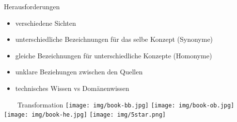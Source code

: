 \documentclass[aspectratio=1610,12pt]{beamer}
\newcommand{\imageslide}[4][]
{
\newgeometry{margin=0cm,top=1em}
\begin{frame}[plain]{~~~~#2}
\vspace{0.2em}
\centering\texttt{[image: \#3]}
\\#1
\note{#4}
\end{frame}
\restoregeometry
}
\begin{document}
{\begin{frame}{Herausforderungen}
\begin{itemize}
\item verschiedene Sichten
\item unterschiedliche Bezeichnungen für das selbe Konzept (Synonyme)
\item gleiche Bezeichnungen für unterschiedliche Konzepte (Homonyme)
\item unklare Beziehungen zwischen den Quellen
\item technisches Wissen vs Domänenwissen 
\end{itemize}
\end{frame}
\iffalse
\begin{frame}{Herausforderungen in der Transformation (2)}
\begin{itemize}
	\item Manuelle, zeit-aufwendige Extraktion (teilweise gelöst)
\item nicht alle Extrahierenden haben Semantic Web Kenntnisse
\begin{itemize}
\item Tabelle als Zwischenschritt
\item "Medien-Diskontinuität", Informationsverlust
\item Inferenz der OWL Beschränkungen von begrenzten Daten 
\end{itemize}
\item Modellierung als Klassen vs. Individuen
\item detaillierte Ontologie-Modellierung vs. große Anzahl an Instanzen 
\end{itemize}
\end{frame}
\fi

\begin{frame}[plain]{~~~~Transformation}
\centering\texttt{[image: img/book-bb.jpg]}
\centering\texttt{[image: img/book-ob.jpg]}
\centering\texttt{[image: img/book-he.jpg]}
\centering\texttt{[image: img/5star.png]}
\end{frame}
\restoregeometry


}
\end{document}
